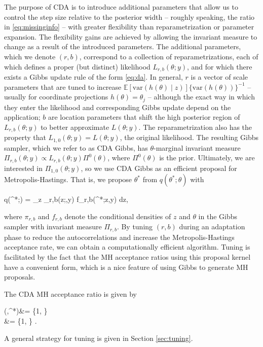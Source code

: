 \documentclass[twoside,11pt]{article}
\newcommand{\be}{\begin{equs}}
\newcommand{\ee}{\end{equs}}
\newcommand{\bb}[1]{\mathbb{#1}}
\newcommand{\mc}[1]{\mathcal{#1}}
\newcommand{\var}{\text{var}}
\newcommand{\1}{\mathbf 1}
\begin{document}
The purpose of CDA is to introduce additional parameters that allow us to control the step size relative to the posterior width -- roughly speaking, the ratio in \eqref{eq:missinginfo} -- with greater flexibility than reparametrization or parameter expansion. The flexibility gains are achieved by allowing the invariant measure to change as a result of the introduced parameters. The additional parameters, which we denote $(r,b)$, correspond to a collection of reparametrizations, each of which defines a proper (but distinct) likelihood $L_{r,b}(\theta;y)$, and for which there exists a Gibbs update rule of the form \eqref{eq:da}. In general,  $r$ is a vector of scale parameters that are tuned to increase $\bb E[\var(h(\theta) \mid z)]\{\var(h(\theta))\}^{-1}$ -- usually for coordinate projections $h(\theta) = \theta_j$ -- although the exact way in which they enter the likelihood and corresponding Gibbs update depend on the application; {$b$ are  location parameters that shift the high posterior region of $L_{r,b}(\theta;y)$ to better approximate $L(\theta;y)$.
}
The reparametrization also has the property that $L_{1,0}(\theta;y) = L(\theta;y)$, the original likelihood. The resulting Gibbs sampler, which we refer to as CDA Gibbs, has $\theta$-marginal invariant measure $\Pi_{r,b}(\theta;y) \propto L_{r,b}(\theta;y) \Pi^0(\theta)$, where $\Pi^0(\theta)$ is the prior. Ultimately, we are interested in $\Pi_{1,0}(\theta;y)$, so we use CDA Gibbs as an efficient proposal for Metropolis-Hastings. That is, we propose $\theta^*$ from $q(\theta^*;\theta)$ with
\be \label{eq:Q}
q(\theta^*;\theta) = \int_{z \in \mc Z} \pi_{r,b}(z;\theta,y) f_{r,b}(\theta^*;z,y) dz,
\ee
where $\pi_{r,b}$ and $f_{r,b}$ denote the conditional densities of $z$ and $\theta$ in the Gibbs sampler with invariant measure $\Pi_{r,b}$. By tuning  $(r,b)$ during an adaptation phase to reduce the autocorrelations and increase the Metropolis-Hastings acceptance rate, we can obtain a computationally efficient algorithm. Tuning is facilitated by the fact that the MH acceptance ratios using this proposal kernel have a convenient form, which is a nice feature of using Gibbs to generate MH proposals.
\begin{remark} \label{rem:accrat}
The CDA MH acceptance ratio is given by
\be
\alpha(\theta,\theta^*)&= \min\bigg \{1, \bigg \} \\
&= \min\bigg \{1,  \bigg \} \label{eq:MH-accrat}.
\ee
\end{remark}
A general strategy for tuning is given in Section \ref{sec:tuning}. 
\end{document}
